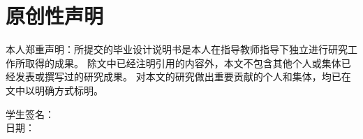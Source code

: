 \chapter*{原创性声明}

本人郑重声明：所提交的毕业设计说明书是本人在指导教师指导下独立进行研究工作所取得的成果。
除文中已经注明引用的内容外，本文不包含其他个人或集体已经发表或撰写过的研究成果。
对本文的研究做出重要贡献的个人和集体，均已在文中以明确方式标明。

\vspace{4em}

\begin{flushright}
学生签名：\underline{\makebox[8em]{}} \\
\vspace{1em}
日期：\underline{\makebox[8em]{}}
\end{flushright}
